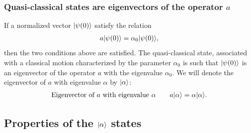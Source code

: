 \subsubsection{Quasi-classical states are eigenvectors of the operator $a$}
If a normalized vector $|\psi(0)\rangle$ satisfy the relation 
\begin{align}
    a|\psi(0)\rangle=\alpha_0|\psi(0)\rangle,
    \label{eq:twoconditionsequation}
\end{align}
then the two conditions above are satisfied.
%
The quasi-classical state, associated with a classical motion characterized by the parameter $\alpha_0$ is such that $|\psi(0)\rangle$ is an eigenvector of the operator 
$a$ with the eigenvalue $\alpha_0$. We will denote the eigenvector of $a$ with eigenvalue $\alpha$ by $|\alpha\rangle$:
\begin{align}
    \text{Eigenvector of $a$ with eigenvalue $\alpha$}\qquad a|\alpha\rangle=\alpha|\alpha\rangle.
    \label{eq:eigenvectoralpha}
\end{align}
\subsection{Properties of the $|\alpha\rangle$ states}
%
